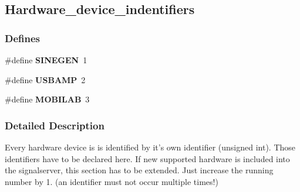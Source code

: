 \hypertarget{group__hardware__device__indentifiers}{
\subsection{Hardware\_\-device\_\-indentifiers}
\label{group__hardware__device__indentifiers}
}
\subsubsection*{Defines}
\begin{DoxyCompactItemize}
\item 
\hypertarget{group__hardware__device__indentifiers_gad68d8e481b9a5977baf9da7d42c10392}{
\#define {\bfseries SINEGEN}~1}
\label{group__hardware__device__indentifiers_gad68d8e481b9a5977baf9da7d42c10392}

\item 
\hypertarget{group__hardware__device__indentifiers_gacbc830e33824e2097de7416967b1c9f5}{
\#define {\bfseries USBAMP}~2}
\label{group__hardware__device__indentifiers_gacbc830e33824e2097de7416967b1c9f5}

\item 
\hypertarget{group__hardware__device__indentifiers_gabedaae2f367790197f74713459dfcbc2}{
\#define {\bfseries MOBILAB}~3}
\label{group__hardware__device__indentifiers_gabedaae2f367790197f74713459dfcbc2}

\end{DoxyCompactItemize}


\subsubsection{Detailed Description}
Every hardware device is is identified by it's own identifier (unsigned int). Those identifiers have to be declared here. If new supported hardware is included into the signalserver, this section has to be extended. Just increase the running number by 1. (an identifier must not occur multiple times!) 